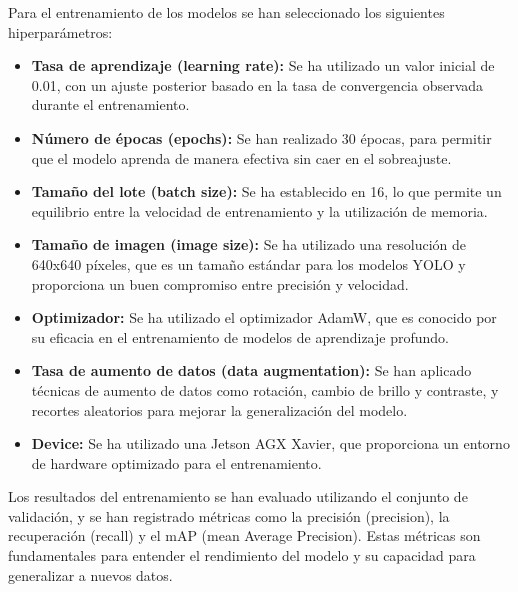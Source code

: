 \documentclass[11pt,spanish,listoffigures,listoftables]{tfgetsinf}
\begin{document}
Para el entrenamiento de los modelos se han seleccionado los siguientes hiperparámetros:
\begin{itemize}
   \item \textbf{Tasa de aprendizaje (learning rate):} Se ha utilizado un valor inicial de 0.01, con un ajuste posterior basado en la tasa de convergencia observada durante el entrenamiento.
   \item \textbf{Número de épocas (epochs):} Se han realizado 30 épocas, para permitir que el modelo aprenda de manera efectiva sin caer en el sobreajuste.
   \item \textbf{Tamaño del lote (batch size):} Se ha establecido en 16, lo que permite un equilibrio entre la velocidad de entrenamiento y la utilización de memoria.
   \item \textbf{Tamaño de imagen (image size):} Se ha utilizado una resolución de 640x640 píxeles, que es un tamaño estándar para los modelos YOLO y proporciona un buen compromiso entre precisión y velocidad.
   \item \textbf{Optimizador:} Se ha utilizado el optimizador AdamW, que es conocido por su eficacia en el entrenamiento de modelos de aprendizaje profundo.
   \item \textbf{Tasa de aumento de datos (data augmentation):} Se han aplicado técnicas de aumento de datos como rotación, cambio de brillo y contraste, y recortes aleatorios para mejorar la generalización del modelo.
   \item \textbf{Device:} Se ha utilizado una Jetson AGX Xavier, que proporciona un entorno de hardware optimizado para el entrenamiento.
\end{itemize}



Los resultados del entrenamiento se han evaluado utilizando el conjunto de validación, y se han registrado métricas como la precisión (precision), la recuperación (recall) y el mAP (mean Average Precision). Estas métricas son fundamentales para entender el rendimiento del modelo y su capacidad para generalizar a nuevos datos.
\end{document}

